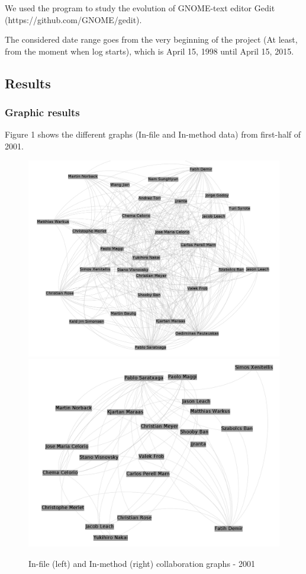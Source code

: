 \documentclass[a4paper]{article}
\begin{document}
We used the program to study the evolution of GNOME-text editor Gedit (https://github.com/GNOME/gedit).

The considered date range goes from the very beginning of the project (At
least, from the moment when log starts), which is April 15, 1998 until April
15, 2015.

\subsection{Results}

\subsubsection{Graphic results}

Figure 1 shows the different graphs (In-file and In-method data) from
first-half of 2001.

\begin{figure}[ht]
\begin{center}
\includegraphics[scale=0.17]{g2001files.png} 
\includegraphics[scale=0.17]{g2001methods.png}
\caption{In-file (left) and In-method (right) collaboration graphs - 2001}
\label{fig:fixme1}
\end{center}
\end{figure}
\end{document}
